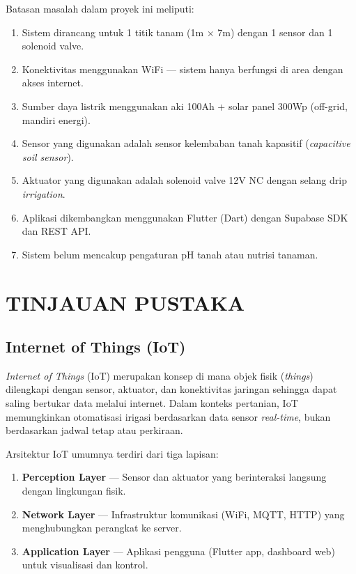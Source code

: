 \documentclass[12pt,a4paper,oneside]{report}
\begin{document}
Batasan masalah dalam proyek ini meliputi:
\begin{enumerate}
    \item Sistem dirancang untuk 1 titik tanam (1m × 7m) dengan 1 sensor dan 1 solenoid valve.
    \item Konektivitas menggunakan WiFi — sistem hanya berfungsi di area dengan akses internet.
    \item Sumber daya listrik menggunakan aki 100Ah + solar panel 300Wp (off-grid, mandiri energi).
    \item Sensor yang digunakan adalah sensor kelembaban tanah kapasitif (\textit{capacitive soil sensor}).
    \item Aktuator yang digunakan adalah solenoid valve 12V NC dengan selang drip \textit{irrigation}.
    \item Aplikasi dikembangkan menggunakan Flutter (Dart) dengan Supabase SDK dan REST API.
    \item Sistem belum mencakup pengaturan pH tanah atau nutrisi tanaman.
\end{enumerate}


\chapter{TINJAUAN PUSTAKA}

\section{Internet of Things (IoT)}

\textit{Internet of Things} (IoT) merupakan konsep di mana objek fisik (\textit{things}) dilengkapi dengan sensor, aktuator, dan konektivitas jaringan sehingga dapat saling bertukar data melalui internet. Dalam konteks pertanian, IoT memungkinkan otomatisasi irigasi berdasarkan data sensor \textit{real-time}, bukan berdasarkan jadwal tetap atau perkiraan.

Arsitektur IoT umumnya terdiri dari tiga lapisan:
\begin{enumerate}
    \item \textbf{Perception Layer} — Sensor dan aktuator yang berinteraksi langsung dengan lingkungan fisik.
    \item \textbf{Network Layer} — Infrastruktur komunikasi (WiFi, MQTT, HTTP) yang menghubungkan perangkat ke server.
    \item \textbf{Application Layer} — Aplikasi pengguna (Flutter app, dashboard web) untuk visualisasi dan kontrol.
\end{enumerate}
\end{document}
